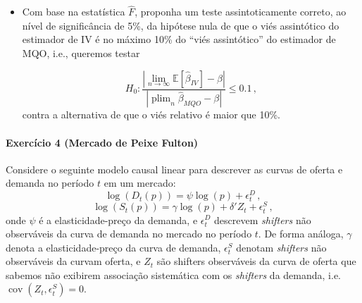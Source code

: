 \documentclass[10pt,a4paper]{article}
\begin{document}
\begin{itemize}
	$$\hat{t} = \frac{\sum_{i=1}^n (X_i -\bar{X})(Z_i - \bar{Z})}{\hat{\sigma}_V \sqrt{\sum_{i=1}^n(Z_i-\bar{Z})^2}}\, .$$
	
	Mostre que:
	
	$$\hat t \overset{d}{\to} \mathcal{N}\left(\frac{C \operatorname{sd}(V)}{ \operatorname{sd}(Z)}, 1\right)\, .$$
	
	Calcule a distribuição assintótica da estatística $\hat F = \hat t^2$.

	
	

   \item[f] Com base na estatística $\hat F$, proponha um teste assintoticamente correto, ao nível de significância de 5\%, da hipótese nula de que o viés assintótico do estimador de IV é no máximo 10\% do ``viés assintótico'' do estimador de MQO, i.e., queremos testar
   
   $$H_0: \frac{|\lim_{n \to \infty}\mathbb{E}[\hat{\beta}_{IV}] - \beta |}{|\operatorname{plim}_n \hat{\beta}_{MQO} -\beta|}\leq 0.1\, ,$$
   contra a alternativa de que o viés relativo é maior que 10\%.

\end{itemize}

\paragraph{Exercício 4 (Mercado de Peixe Fulton)} Considere o seguinte modelo causal linear para descrever as curvas de oferta e demanda no período $t$ em um mercado:
$$\log(D_t(p)) = \psi \log(p) + \epsilon^D_t\, ,$$
$$\log(S_t(p)) = \gamma \log(p) + \delta' Z_t + \epsilon^S_t\, , $$
onde $\psi$ é a elasticidade-preço da demanda, e $\epsilon^D_t$ descrevem \textit{shifters} não observáveis da curva de demanda no mercado no período $t$. De forma análoga, $\gamma$ denota a elasticidade-preço da curva de demanda, $\epsilon^S_t$ denotam \textit{shifters} não observáveis da curvam oferta, e $Z_t$ são shifters observáveis da curva de oferta que sabemos não exibirem associação sistemática com os \textit{shifters} da demanda, i.e. $\operatorname{cov}(Z_t, \epsilon^S_t)=0$.
\end{document}
